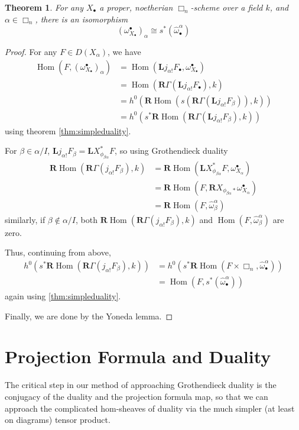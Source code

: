 \documentclass[proquest]{uwthesis}[2014/11/13]
\newtheorem{theorem}{Theorem}[section]
\theoremstyle{definition}
\DeclareMathOperator{\Hom}{Hom}
\newcommand{\bL}{\textbf{L}}
\newcommand{\bR}{\textbf{R}}
\begin{document}
\begin{theorem}
	For any $X_\bullet$ a proper, noetherian $\Box_n$-scheme over a field $k$, and $\alpha \in \Box_n$, there is an isomorphism
	\[
		(\omega_{X_\bullet}^\bullet)_\alpha \cong s^*(\hat{\omega}^\alpha_\bullet)
	\]
\end{theorem}
\begin{proof}
	For any $F \in D(X_\alpha)$, we have 
	\begin{align*}
	\Hom(F, (\omega_{X_\bullet}^\bullet)_\alpha) &= \Hom(\bL j_{\alpha !} F_\bullet, \omega_{X_\bullet}^\bullet) \\
	&= \Hom(\bR \Gamma(\bL j_{\alpha !} F_\bullet), k) \\
	&= h^0(\bR \Hom(s(\bR \Gamma (\bL j_{\alpha !} F_\beta)),k)) \\
	&= h^0(s^* \bR \Hom(\bR \Gamma(\bL j_{\alpha !} F_\beta), k))
	\end{align*}
	using theorem \ref{thm:simpleduality}.
	
	For $\beta \in \alpha / I$, $\bL j_{\alpha !} F_\beta = \bL X_{\phi_{\beta \alpha}}^* F$, so using Grothendieck duality
	\begin{align*}
		\bR \Hom(\bR \Gamma(j_{\alpha !} F_\beta),k)  &= \bR \Hom(\bL X_{\phi_{\beta \alpha}}^* F, \omega_{X_\alpha}^\bullet) \\
		&= \bR \Hom(F, \bR X_{\phi_{\beta \alpha} *} \omega_{X_\alpha}^\bullet) \\
		&= \bR \Hom(F, \hat{\omega}^\alpha_\beta)
	\end{align*}
	similarly, if $\beta \not \in \alpha / I$, both $\bR \Hom(\bR \Gamma(j_{\alpha !} F_\beta), k)$ and $\Hom(F, \hat{\omega}^\alpha_\beta)$ are zero.
	
	Thus, continuing from above,
	\begin{align*}
		h^0(s^* \bR \Hom(\bR \Gamma(j_{\alpha !} F_\beta), k)) &= h^0(s^* \bR \Hom(F \times \Box_n, \hat{\omega}^\alpha_\bullet)) \\
		&= \Hom(F, s^*(\hat{\omega}^\alpha_\bullet))
	\end{align*}
	again using \ref{thm:simpleduality}.
	
	Finally, we are done by the Yoneda lemma.
\end{proof}

\section{Projection Formula and Duality}

The critical step in our method of approaching Grothendieck duality is the conjugacy of the duality and the projection formula map, so that we can approach the complicated hom-sheaves of duality via the much simpler (at least on diagrams) tensor product.
\end{document}
